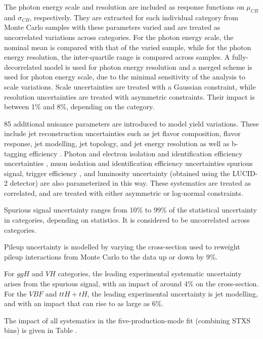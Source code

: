 The photon energy scale and resolution are included as response functions on $\mu_{CB}$ and $\sigma_{CB}$, respectively. They are extracted for each individual category from Monte Carlo samples with these parameters varied and are treated as uncorrelated variations across categories. For the photon energy scale, the nominal mean is compared with that of the varied sample, while for the photon energy resolution, the inter-quartile range is compared across samples. A fully-decorrelated model is used for photon energy resolution and a merged scheme is used for photon energy scale, due to the minimal sensitivity of the analysis to scale variations. Scale uncertainties are treated with a Gaussian constraint, while resolution uncertainties are treated with asymmetric constraints. Their impact is between 1\% and 8\%, depending on the category.

85 additional nuisance parameters are introduced to model yield variations. These include jet reconstruction uncertainties such as jet flavor composition, flavor response, jet modelling, jet topology, and jet energy resolution \cite{coups127} as well as b-tagging efficiency \cite{jetuncs4}. Photon and electron isolation and identification efficiency uncertainties \cite{CERN-EP-2019-145}, muon isolation and identification efficiency uncertainties \cite{CERN-EP-2016-033} spurious signal, trigger efficiency \cite{triggerperformance}, and luminosity uncertainty (obtained using the LUCID-2 detector) \cite{LUCID} are also parameterized in this way. These systematics are treated as correlated, and are treated with either asymmetric or log-normal constraints.

Spurious signal uncertainty ranges from 10\% to 99\% of the statistical uncertainty in categories, depending on statistics. It is considered to be uncorrelated across categories.

Pileup uncertainty is modelled by varying the cross-section used to reweight pileup interactions from Monte Carlo to the data up or down by 9\%. 

For $ggH$ and $VH$ categories, the leading experimental systematic uncertainty arises from the spurious signal, with an impact of around 4\% on the cross-section. For the $VBF$ and $ttH+tH$, the leading experimental uncertainty is jet modelling, and with an impact that can rise to as large as 6\%.

The impact of all systematics in the five-production-mode fit (combining STXS bins) is given in Table \label{tab:result:systematic}. 

